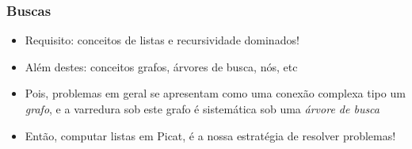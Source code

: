 \begin{frame}

    \frametitle{Buscas}

   \begin{block}{}
     \begin{itemize}
      \item Requisito: conceitos de listas e recursividade  dominados!
       \pause
      \item Além destes: conceitos grafos, árvores de busca, nós, etc
         
       \pause
      \item Pois, problemas em geral
      se apresentam como uma conexão complexa tipo um \textit{grafo},
      e a varredura sob este grafo é sistemática
      sob uma \textit{árvore de busca}
      \pause
      
     \item Então, computar listas em Picat, é a nossa estratégia
     de resolver problemas!

    \end{itemize}
    
    \end{block}
    
\end{frame}



